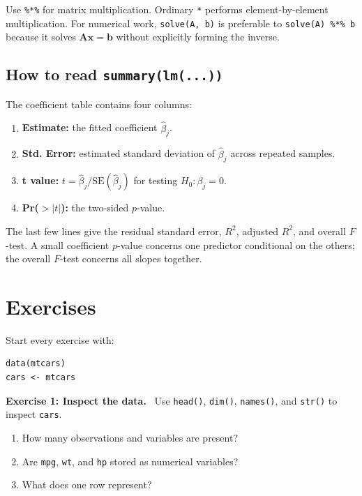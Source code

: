 \documentclass[11pt]{article}
\newenvironment{exercise}[1]
 {\par\medskip\noindent\color{navy}\textbf{Exercise #1.}\color{black}\ }
 {\par\medskip}
\begin{document}
Use \texttt{\%*\%} for matrix multiplication. Ordinary \texttt{*} performs
element-by-element multiplication. For numerical work, \texttt{solve(A, b)}
is preferable to \texttt{solve(A) \%*\% b} because it solves
$\mathbf A\mathbf x=\mathbf b$ without explicitly forming the inverse.

\subsection{How to read \texttt{summary(lm(...))}}

The coefficient table contains four columns:
\begin{enumerate}[leftmargin=*]
 \item \textbf{Estimate:} the fitted coefficient $\widehat\beta_j$.
 \item \textbf{Std. Error:} estimated standard deviation of
 $\widehat\beta_j$ across repeated samples.
 \item \textbf{t value:} $t=\widehat\beta_j/\mathrm{SE}(\widehat\beta_j)$
 for testing $H_0:\beta_j=0$.
 \item \textbf{Pr($>|t|$):} the two-sided $p$-value.
\end{enumerate}

The last few lines give the residual standard error, $R^2$, adjusted $R^2$,
and overall $F$-test. A small coefficient $p$-value concerns one predictor
conditional on the others; the overall $F$-test concerns all slopes together.

\newpage
\section{Exercises}

Start every exercise with:
\begin{lstlisting}
data(mtcars)
cars <- mtcars
\end{lstlisting}

\begin{exercise}{1: Inspect the data}
Use \texttt{head()}, \texttt{dim()}, \texttt{names()}, and \texttt{str()} to
inspect \texttt{cars}.
\begin{enumerate}[label=(\alph*),leftmargin=*]
 \item How many observations and variables are present?
 \item Are \texttt{mpg}, \texttt{wt}, and \texttt{hp} stored as numerical
 variables?
 \item What does one row represent?
\end{enumerate}
\end{exercise}
\end{document}

